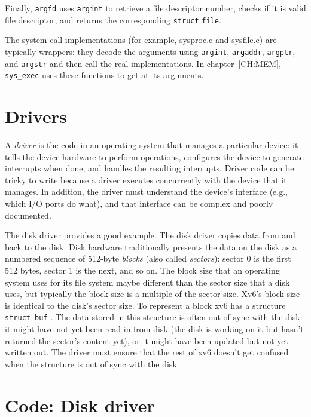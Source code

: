 {Finally,
\lstinline{argfd}
uses
\lstinline{argint}
to retrieve a file descriptor number, checks if it is valid
file descriptor, and returns the corresponding
\lstinline{struct}
\lstinline{file}.

The system call implementations (for example, sysproc.c and sysfile.c)
are typically wrappers: they decode the arguments using 
\lstinline{argint},
\lstinline{argaddr},
\lstinline{argptr}, 
and 
\lstinline{argstr}
and then call the real implementations.
In chapter~\ref{CH:MEM},
\lstinline{sys_exec}
uses these functions to get at its arguments.


\section{Drivers}
A
\textit{driver}
is the code in an operating system that manages a particular device:
it tells the device hardware to perform operations,
configures the device to generate interrupts when done,
and handles the resulting interrupts.
Driver code can be tricky to write
because a driver executes concurrently with the device that it manages.  In
addition, the driver must understand the device's interface (e.g., which I/O
ports do what), and that interface can be complex and poorly documented.

The disk driver provides a good example.  The disk driver copies data
from and back to the disk.  Disk hardware traditionally presents the data on the
disk as a numbered sequence of 512-byte 
\textit{blocks} 
(also called 
\textit{sectors}): 
sector 0 is the first 512 bytes, sector 1 is the next, and so on. The block size
that an operating system uses for its file system maybe different than the
sector size that a disk uses, but typically the block size is a multiple of the
sector size.  Xv6's block size is identical to the disk's sector size.  To
represent a block xv6 has a structure
\lstinline{struct buf}
.
The
data stored in this structure is often out of sync with the disk: it might have
not yet been read in from disk (the disk is working on it but hasn't returned
the sector's content yet), or it might have been updated but not yet written
out.  The driver must ensure that the rest of xv6 doesn't get confused when the
structure is out of sync with the disk.
\section{Code: Disk driver}

}
